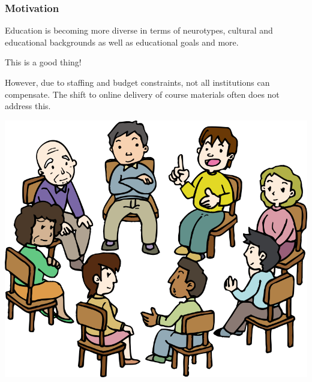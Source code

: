\documentclass[aspectratio=169, usenames, dvipsnames]{beamer}
\begin{document}
\begin{frame}
\frametitle{Motivation}
\begin{minipage}{0.55\textwidth}
Education is becoming more diverse in terms of neurotypes, cultural and educational backgrounds as well as educational goals and more.
\bigskip

\Large This is a good thing!
\bigskip

\normalsize However, due to staffing and budget constraints, not all institutions can compensate. The shift to online delivery of course materials often does not address this.
\end{minipage}
\hfill
\begin{minipage}{0.4\textwidth}
\includegraphics[height=0.6\textheight,keepaspectratio]{images/group_session} 
\end{minipage}%
\end{frame}
\end{document}
